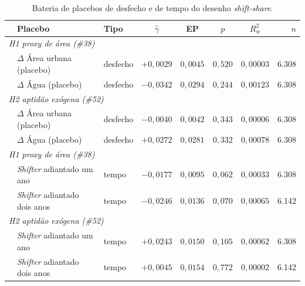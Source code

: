 \begin{table}[!ht]
\centering
\caption[Placebos de desfecho e de tempo]{Bateria de placebos de desfecho e de tempo do desenho \emph{shift-share}.}
\label{tab:placebos}
\footnotesize
\begin{tabular}{lp{4.0cm}lccccr}
\toprule
& \textbf{Placebo} & \textbf{Tipo} & \textbf{$\hat{\gamma}$} & \textbf{EP} & \textbf{$p$} & \textbf{$R^2_w$} & \textbf{$n$} \\
\midrule
\multicolumn{8}{l}{\textit{H1 proxy de área (\#38)}} \\
 & $\Delta$ Área urbana (placebo) & desfecho & $+0{,}0029$ & $0{,}0045$ & $0{,}520$ & $0{,}00003$ & 6.308 \\
 & $\Delta$ Água (placebo) & desfecho & $-0{,}0342$ & $0{,}0294$ & $0{,}244$ & $0{,}00123$ & 6.308 \\
\multicolumn{8}{l}{\textit{H2 aptidão exógena (\#52)}} \\
 & $\Delta$ Área urbana (placebo) & desfecho & $-0{,}0040$ & $0{,}0042$ & $0{,}343$ & $0{,}00006$ & 6.308 \\
 & $\Delta$ Água (placebo) & desfecho & $+0{,}0272$ & $0{,}0281$ & $0{,}332$ & $0{,}00078$ & 6.308 \\
\multicolumn{8}{l}{\textit{H1 proxy de área (\#38)}} \\
 & \emph{Shifter} adiantado um ano & tempo & $-0{,}0177$ & $0{,}0095$ & $0{,}062$ & $0{,}00033$ & 6.308 \\
 & \emph{Shifter} adiantado dois anos & tempo & $-0{,}0246$ & $0{,}0136$ & $0{,}070$ & $0{,}00065$ & 6.142 \\
\multicolumn{8}{l}{\textit{H2 aptidão exógena (\#52)}} \\
 & \emph{Shifter} adiantado um ano & tempo & $+0{,}0243$ & $0{,}0150$ & $0{,}105$ & $0{,}00062$ & 6.308 \\
 & \emph{Shifter} adiantado dois anos & tempo & $+0{,}0045$ & $0{,}0154$ & $0{,}772$ & $0{,}00002$ & 6.142 \\
\bottomrule
\end{tabular}
\end{table}

